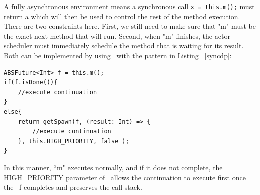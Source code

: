 \par A fully asynchronous environment means a synchronous call \texttt{x = this.m();} must return a \future which will then be used to control the rest of the method execution. There are two constraints here. First, we still need to make sure that "m" must be the exact next method that will run. Second, when "m" finishes, the actor scheduler must immediately schedule the method that is waiting for its result. Both can be implemented by using \gspawn ~with the pattern in Listing ~\ref{syncdp}:

\begin{lstlisting}[caption= Synchronous Call Pattern, label=syncdp]
ABSFuture<Int> f = this.m();
if(f.isDone()){
	//execute continuation
}
else{
	return getSpawn(f, (result: Int) => {
		//execute continuation
	}, this.HIGH_PRIORITY, false );
}
\end{lstlisting}
In this manner, ``m" executes normally, and if it does not complete, the HIGH\_PRIORITY parameter of \gspawn ~allows the continuation to execute first once the \future ~f completes and preserves the call stack.




